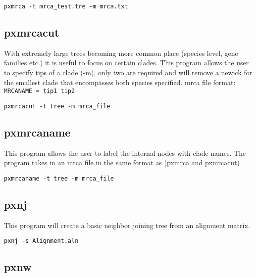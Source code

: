 \documentclass[12pt,letterpaper]{memoir}
\begin{document}
\begin{flushleft}
\begin{verbatim}
pxmrca -t mrca_test.tre -m mrca.txt
\end{verbatim}
\end{flushleft}

\subsection{pxmrcacut}

With extremely large trees becoming more common place (species level, gene families etc.) it is useful to focus on certain clades. This program allows the user to specify tips of a clade (-m), only two are required and will remove a newick for the smallest clade that encompasses both species specified. mrca file format:
\texttt{MRCANAME = tip1 tip2}

\begin{flushleft}
\begin{verbatim}
pxmrcacut -t tree -m mrca_file
\end{verbatim}
\end{flushleft}

\subsection{pxmrcaname}

This program allows the user to label the internal nodes with clade names. The program takes in an mrca file in the same format as (pxmrca and pxmrcacut)

\begin{flushleft}
\begin{verbatim}
pxmrcaname -t tree -m mrca_file
\end{verbatim}
\end{flushleft}

\subsection{pxnj}

This program will create a basic neighbor joining tree from an alignment matrix.

\begin{flushleft}
\begin{verbatim}
pxnj -s Alignment.aln
\end{verbatim}
\end{flushleft}

\subsection{pxnw}
\end{document}

